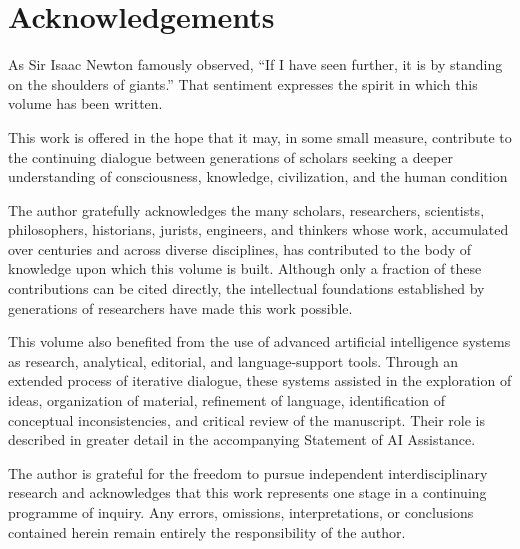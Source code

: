 \clearpage
\section*{Acknowledgements}



As Sir Isaac Newton famously observed, ``If I have seen further, it is by standing on the shoulders of giants.'' That sentiment expresses the spirit in which this volume has been written.

This work is offered in the hope that it may, in some small measure, contribute to the continuing dialogue between generations of scholars seeking a deeper understanding of consciousness, knowledge, civilization, and the human condition

The author gratefully acknowledges the many scholars, researchers, scientists, philosophers, historians, jurists, engineers, and thinkers whose work, accumulated over centuries and across diverse disciplines, has contributed to the body of knowledge upon which this volume is built. Although only a fraction of these contributions can be cited directly, the intellectual foundations established by generations of researchers have made this work possible.

This volume also benefited from the use of advanced artificial intelligence systems as research, analytical, editorial, and language-support tools. Through an extended process of iterative dialogue, these systems assisted in the exploration of ideas, organization of material, refinement of language, identification of conceptual inconsistencies, and critical review of the manuscript. Their role is described in greater detail in the accompanying Statement of AI Assistance.

The author is grateful for the freedom to pursue independent interdisciplinary research and acknowledges that this work represents one stage in a continuing programme of inquiry. Any errors, omissions, interpretations, or conclusions contained herein remain entirely the responsibility of the author.